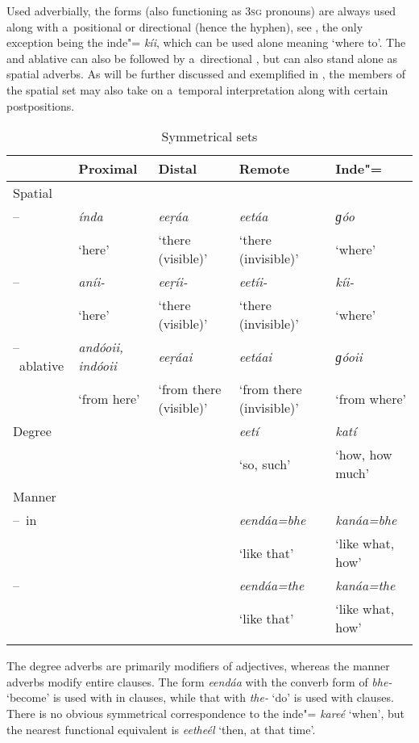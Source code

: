 Used adverbially, the  forms (also functioning as \textsc{3sg}  pronouns) are always used
along with a~positional or directional  (hence the hyphen), see , the only
exception being the inde"= \textit{kíi}, which can be used alone meaning
`where to'. The  and ablative can also be followed by a~directional , but can
also stand alone as spatial adverbs. As will be further discussed and exemplified in , the
members of the spatial set may also take on a~temporal interpretation along with certain
postpositions.


\begin{table}[ht]
\caption{Symmetrical  sets}
\begin{tabularx}{\textwidth}{ l Q Q Q Q }
\lsptoprule
&
Proximal &
Distal &
Remote &
Inde"=\\\midrule
Spatial &
&
&
&
\\
--~ &
\textit{índa} &
\textit{eeṛáa} &
\textit{eetáa} &
\textit{ɡóo} \\
&
`here' &
`there (visible)' &
`there (invisible)' &
`where'\\
--~ &
\textit{aníi-} &
\textit{eeṛíi-} &
\textit{eetíi-} &
\textit{kíi-} \\
&
`here' &
`there (visible)' &
`there (invisible)' &
`where'\\
--~ablative &
\textit{andóoii, indóoii} &
\textit{eeṛáai} &
\textit{eetáai} &
\textit{ɡóoii} \\
&
`from here' &
`from there (visible)' &
`from there (invisible)' &
`from where'\\
Degree &
&
&
\textit{eetí} &
\textit{katí} \\
&
&
&
`so, such' &
`how, how much'\\
Manner &
&
&
&
\\
--~in &
&
&
\textit{eendáa=bhe} &
\textit{kanáa=bhe} \\
&
&
&
`like that' &
`like what, how'\\
--~ &
&
&
\textit{eendáa=the} &
\textit{kanáa=the} \\
&
&
&
`like that' &
`like what, how'\\\lspbottomrule
\end{tabularx}
\label{tab:7-1}
\end{table}

The degree adverbs are primarily modifiers of adjectives, whereas the manner adverbs modify entire clauses. The form \textit{eendáa} with the converb form of \textit{bhe-} `become' is used with in clauses, while that with \textit{the-} `do' is used with  clauses. There is no obvious symmetrical correspondence to the inde"=  \textit{kareé} `when', but the nearest functional equivalent is \textit{eetheél} `then, at that time'. 

